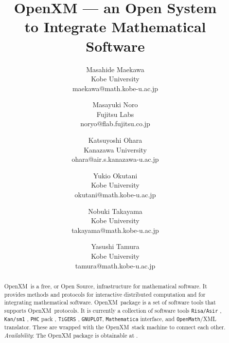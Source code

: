 \documentclass[notitlepage]{book}
\def\OpenXM{{\rm OpenXM\ }}
\begin{document}
\title{OpenXM 
      --- an Open System \\ to Integrate Mathematical Software}
\author{{Masahide Maekawa}\\
         {Kobe University}\\
         {maekawa@math.kobe-u.ac.jp}\\
         \and
         {Masayuki Noro}\\
         {Fujitsu Labs}\\
         {noryo@flab.fujitsu.co.jp}
         \and
         {Katsuyoshi Ohara}\\
         {Kanazawa University}\\
         {ohara@air.s.kanazawa-u.ac.jp}
         \and
         {Yukio Okutani}\\
         {Kobe University}\\
         {okutani@math.kobe-u.ac.jp}
         \and
         {Nobuki Takayama}\\
         {Kobe University}\\
         {takayama@math.kobe-u.ac.jp}
         \and
         {Yasushi Tamura}\\
         {Kobe University}\\
         {tamura@math.kobe-u.ac.jp}
       }
\maketitle

\begin{abstract}
\OpenXM is a free, or Open Source, infrastructure for mathematical
software.
It provides methods and protocols 
for interactive distributed computation and
for integrating mathematical software.
\OpenXM package is a set of software tools that supports \OpenXM protocols.
It is currently a collection of software tools
{\tt Risa/Asir} \cite{asir}, {\tt Kan/sm1} \cite{kan},
{\tt PHC} pack \cite{phc}, {\tt TiGERS} \cite{tigers},
{\tt GNUPLOT},
{\tt Mathematica} interface, and
{\tt OpenMath}/XML \cite{OpenMath} translator.
These are wrapped with the \OpenXM stack machine
to connect each other.
{\it Availability}: The OpenXM package is obtainable at \cite{openxm-web}.
\end{abstract}





















\end{document}
